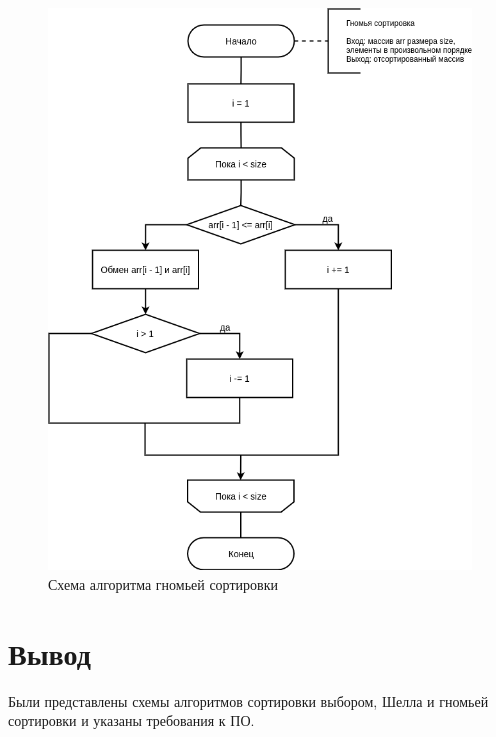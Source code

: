 \newpage

\begin{figure}[H]
	\begin{center}
		\includegraphics[scale=0.5]{img/gnome_sort.png}
	\end{center}
	\captionsetup{justification=centering}
	\caption{Схема алгоритма гномьей сортировки}
	\label{img:gnome_sort}
\end{figure}

\section*{Вывод}

Были представлены схемы алгоритмов сортировки выбором, Шелла и гномьей сортировки и указаны требования к ПО.
